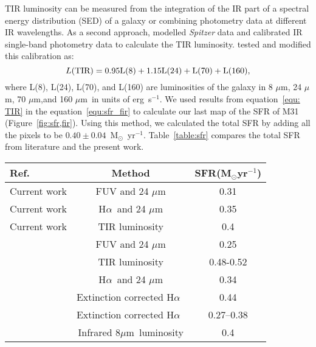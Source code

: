 \documentclass[useAMS,usenatbib]{mn2e}
\newcommand \halpha    {H$\alpha $\ }
\newcommand \um    {$\mu$m\ }
\newcommand \Spitzer {{\it Spitzer }}
\begin{document}
TIR luminosity can be measured from the integration of the IR part of a spectral energy distribution (SED) of a galaxy or combining photometry data at different IR wavelengths. As a second approach, \cite{Draine07} modelled \Spitzer data and calibrated IR single-band photometry data to calculate the TIR luminosity. \cite{Boquien10} tested and modified this calibration as:
\begin{equation}
 \label{equ: TIR}
L(\rm TIR) = 0.95L(8) + 1.15L(24) + L(70) + L(160),
\end{equation}
\noindent where L(8), L(24), L(70), and L(160) are luminosities of the galaxy in 8 $\mu$m, 24 $\mu$m, 70 $\mu$m,and 160 \um in units of erg~s$^{-1}$. We used results from equation~\ref{equ: TIR} in the equation~\ref{equ:sfr_fir} to calculate our last map of the SFR of M31 (Figure~\ref{fig:sfr,fir}). Using this method, we calculated the total SFR by adding all the pixels to be $0.40 \pm 0.04$~M$_{\odot}$~yr$^{-1}$. Table~\ref{table:sfr} compares the total SFR from literature and the present work. 


\begin{table*}
\begin{minipage}{100mm}
\caption{Comparison of the total star formation rate of M31}
\label{table:sfr}
\begin{tabular}{@{}lcc}
\hline\hline
Ref.&Method&SFR(M$_{\odot}$yr$^{-1}$) \\
\hline
Current work&FUV and 24 $\mu$m&0.31 \\
Current work&\halpha and 24 $\mu$m&0.35 \\
Current work&TIR luminosity&0.4\\
\cite{Ford13}&FUV and 24 $\mu$m&0.25\\
\cite{Ford13}&TIR luminosity&0.48-0.52\\
\cite{Azimlu11}& \halpha and 24 $\mu$m&0.34\\
\cite{Azimlu11}&Extinction corrected \halpha&0.44\\
\cite{Tabatabaei10}&Extinction corrected \halpha&0.27--0.38\\
\cite{Barmby06}&Infrared 8\um luminosity& 0.4\\
\hline
\end{tabular}
\end{minipage}
\end{table*}
\end{document}
